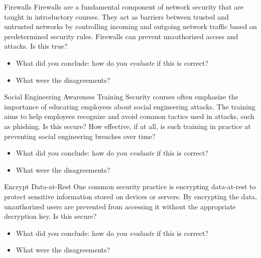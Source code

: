 \begin{frame}
  \begin{block}{Firewalls}
    Firewalls are a fundamental component of network security that are
    taught in introductory courses. They act as barriers between trusted and
    untrusted networks by controlling incoming and outgoing network traffic
    based on predetermined security rules. Firewalls can prevent
    unauthorized access and attacks. Is this true?
  \end{block}

  \begin{question}
    \begin{itemize}
      \item What did you conclude: how do you \emph{evaluate} if this is 
        correct?
      \item What were the disagreements?
    \end{itemize}
  \end{question}
\end{frame}

\begin{frame}
  \begin{block}{Social Engineering Awareness Training}
    Security courses often emphasize the importance of educating employees
    about social engineering attacks. The training aims to help employees
    recognize and avoid common tactics used in attacks, such as phishing.
    Is this secure? How effective, if at all, is such training in practice at 
    preventing social engineering breaches over time?
  \end{block}

  \begin{question}
    \begin{itemize}
      \item What did you conclude: how do you \emph{evaluate} if this is 
        correct?
      \item What were the disagreements?
    \end{itemize}
  \end{question}
\end{frame}

\begin{frame}
  \begin{block}{Encrypt Data-at-Rest}
    One common security practice is encrypting data-at-rest to protect
    sensitive information stored on devices or servers. By encrypting the
    data, unauthorized users are prevented from accessing it without the
    appropriate decryption key. Is this secure?
  \end{block}

  \begin{question}
    \begin{itemize}
      \item What did you conclude: how do you \emph{evaluate} if this is 
        correct?
      \item What were the disagreements?
    \end{itemize}
  \end{question}
\end{frame}

